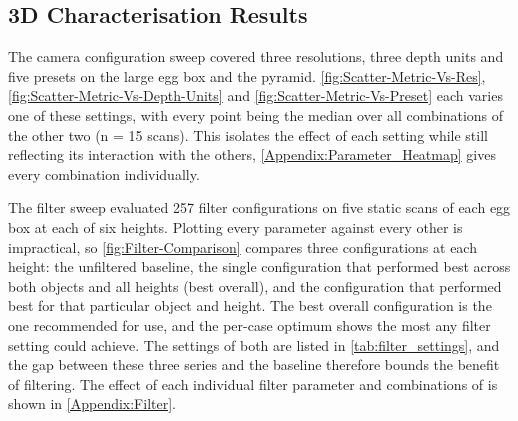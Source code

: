
%
%
%
%
\subsection{3D Characterisation Results}

The camera configuration sweep covered three resolutions, three depth units and five presets on the large egg box and the pyramid. \autoref{fig:Scatter-Metric-Vs-Res}, \autoref{fig:Scatter-Metric-Vs-Depth-Units} and \autoref{fig:Scatter-Metric-Vs-Preset} each varies one of these settings, with every point being the median over all combinations of the other two (n = 15 scans). This isolates the effect of each setting while still reflecting its interaction with the others, \autoref{Appendix:Parameter_Heatmap} gives every combination individually.

The filter sweep evaluated 257 filter configurations on five static scans of each egg box at each of six heights. Plotting every parameter against every other is impractical, so \autoref{fig:Filter-Comparison} compares three configurations at each height: the unfiltered baseline, the single configuration that performed best across both objects and all heights (best overall), and the configuration that performed best for that particular object and height. The best overall configuration is the one recommended for use, and the per-case optimum shows the most any filter setting could achieve. The settings of both are listed in \autoref{tab:filter_settings}, and the gap between these three series and the baseline therefore bounds the benefit of filtering. The effect of each individual filter parameter and combinations of is shown in \autoref{Appendix:Filter}.

